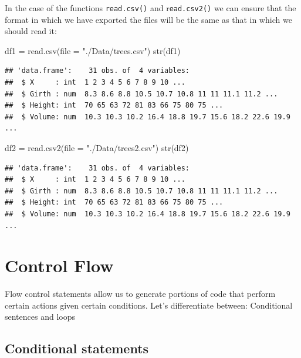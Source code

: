 \documentclass[
]{book}
\newenvironment{Shaded}{\begin{snugshade}}{\end{snugshade}}
\newcommand{\AttributeTok}[1]{\textcolor[rgb]{0.77,0.63,0.00}{#1}}
\newcommand{\FunctionTok}[1]{\textcolor[rgb]{0.00,0.00,0.00}{#1}}
\newcommand{\NormalTok}[1]{#1}
\newcommand{\OtherTok}[1]{\textcolor[rgb]{0.56,0.35,0.01}{#1}}
\newcommand{\StringTok}[1]{\textcolor[rgb]{0.31,0.60,0.02}{#1}}
\begin{document}
In the case of the functions \texttt{read.csv()} and r\texttt{ead.csv2()} we can ensure that the format in which we have exported the files will be the same as that in which we should read it:

\begin{Shaded}
\begin{Highlighting}[]
\NormalTok{df1 }\OtherTok{=} \FunctionTok{read.csv}\NormalTok{(}\AttributeTok{file =} \StringTok{"./Data/trees.csv"}\NormalTok{)}
\FunctionTok{str}\NormalTok{(df1)}
\end{Highlighting}
\end{Shaded}

\begin{verbatim}
## 'data.frame':    31 obs. of  4 variables:
##  $ X     : int  1 2 3 4 5 6 7 8 9 10 ...
##  $ Girth : num  8.3 8.6 8.8 10.5 10.7 10.8 11 11 11.1 11.2 ...
##  $ Height: int  70 65 63 72 81 83 66 75 80 75 ...
##  $ Volume: num  10.3 10.3 10.2 16.4 18.8 19.7 15.6 18.2 22.6 19.9 ...
\end{verbatim}

\begin{Shaded}
\begin{Highlighting}[]
\NormalTok{df2 }\OtherTok{=} \FunctionTok{read.csv2}\NormalTok{(}\AttributeTok{file =} \StringTok{"./Data/trees2.csv"}\NormalTok{)}
\FunctionTok{str}\NormalTok{(df2)}
\end{Highlighting}
\end{Shaded}

\begin{verbatim}
## 'data.frame':    31 obs. of  4 variables:
##  $ X     : int  1 2 3 4 5 6 7 8 9 10 ...
##  $ Girth : num  8.3 8.6 8.8 10.5 10.7 10.8 11 11 11.1 11.2 ...
##  $ Height: int  70 65 63 72 81 83 66 75 80 75 ...
##  $ Volume: num  10.3 10.3 10.2 16.4 18.8 19.7 15.6 18.2 22.6 19.9 ...
\end{verbatim}

\hypertarget{control-flow}{%
\section{Control Flow}\label{control-flow}}

Flow control statements allow us to generate portions of code that perform certain actions given certain conditions. Let's differentiate between: Conditional sentences and loops

\hypertarget{conditional-statements}{%
\subsection{Conditional statements}\label{conditional-statements}}
\end{document}
